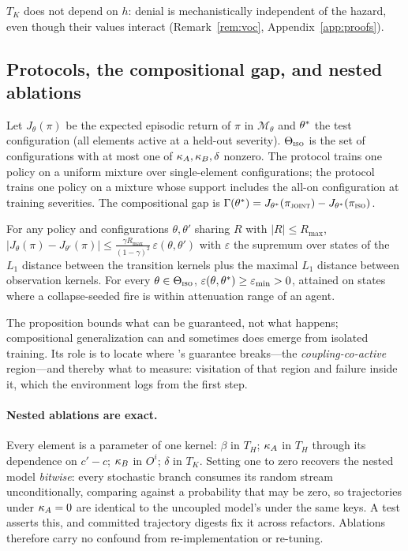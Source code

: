 $T_K$ does not depend on $h$: denial is mechanistically independent of the
hazard, even though their values interact (Remark~\ref{rem:voc},
Appendix~\ref{app:proofs}).

\subsection{Protocols, the compositional gap, and nested ablations}

\begin{definition}
\label{def:gap}
Let $J_\theta(\pi)$ be the expected episodic return of $\pi$ in
$\mathcal{M}_\theta$ and $\theta^{\ast}$ the test configuration (all elements
active at a held-out severity). $\Theta_{\textsc{iso}}$ is the set of configurations
with at most one of $\kappa_A, \kappa_B, \delta$ nonzero. The \ISO{} protocol trains one
policy on a uniform mixture over single-element configurations; the \JOINT{}
protocol trains one policy on a mixture whose support includes the all-on
configuration at training severities. The compositional gap is
$\Gamma(\theta^{\ast}) = J_{\theta^{\ast}}(\pi_{\textsc{joint}}) - J_{\theta^{\ast}}(\pi_{\textsc{iso}})$.
\end{definition}

\begin{proposition}
\label{prop:shift}
For any policy and configurations $\theta, \theta'$ sharing $R$ with $|R| \le
R_{\max}$, $|J_\theta(\pi) - J_{\theta'}(\pi)| \le \frac{\gamma
R_{\max}}{(1-\gamma)^2}\,\varepsilon(\theta,\theta')$ with $\varepsilon$ the
supremum over states of the $L_1$ distance between the transition kernels
plus the maximal $L_1$ distance between observation kernels. For every
$\theta \in \Theta_{\textsc{iso}}$, $\varepsilon(\theta, \theta^{\ast}) \ge
\varepsilon_{\min} > 0$, attained on states where a collapse-seeded fire is
within attenuation range of an agent.
\end{proposition}

The proposition bounds what can be guaranteed, not what happens; compositional
generalization can and sometimes does emerge from isolated training. Its role
is to locate where \ISO's guarantee breaks---the \emph{coupling-co-active}
region---and thereby what to measure: visitation of that region and failure
inside it, which the environment logs from the first step.

\paragraph{Nested ablations are exact.} Every element is a parameter of one
kernel: $\beta$ in $T_H$; $\kappa_A$ in $T_H$ through its dependence on $c'-c$;
$\kappa_B$ in $O^i$; $\delta$ in $T_K$. Setting one to zero recovers the nested
model \emph{bitwise}: every stochastic branch consumes its random stream
unconditionally, comparing against a probability that may be zero, so
trajectories under $\kappa_A = 0$ are identical to the uncoupled model's under the
same keys. A test asserts this, and committed trajectory digests fix it
across refactors. Ablations therefore carry no confound from
re-implementation or re-tuning.

